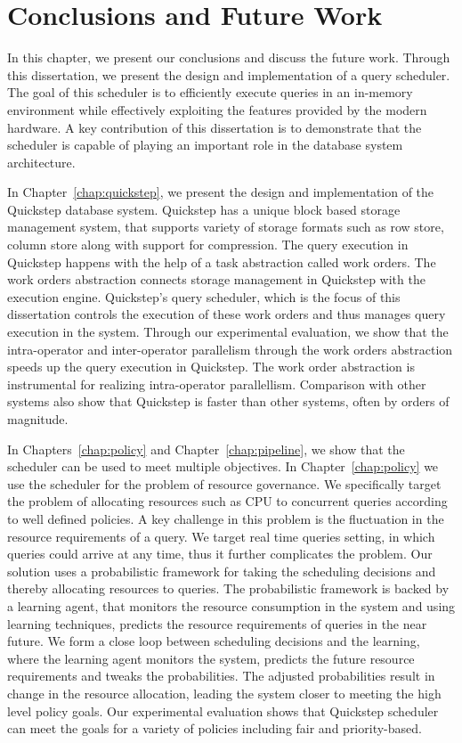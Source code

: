 \chapter{Conclusions and Future Work}
In this chapter, we present our conclusions and discuss the future work.
Through this dissertation, we present the design and implementation of a query scheduler.
The goal of this scheduler is to efficiently execute queries in an in-memory environment while effectively exploiting the features provided by the modern hardware. 
A key contribution of this dissertation is to demonstrate that the scheduler is capable of playing an important role in the database system architecture.

In Chapter~\ref{chap:quickstep}, we present the design and implementation of the Quickstep database system. 
Quickstep has a unique block based storage management system, that supports variety of storage formats such as row store, column store along with support for compression. 
The query execution in Quickstep happens with the help of a task abstraction called work orders. 
The work orders abstraction connects storage management in Quickstep with the execution engine. 
Quickstep's query scheduler, which is the focus of this dissertation controls the execution of these work orders and thus manages query execution in the system. 
Through our experimental evaluation, we show that the intra-operator and inter-operator parallelism through the work orders abstraction speeds up the query execution in Quickstep.
The work order abstraction is instrumental for realizing intra-operator parallellism.
Comparison with other systems also show that Quickstep is faster than other systems, often by orders of magnitude. 

In Chapters~\ref{chap:policy} and Chapter~\ref{chap:pipeline}, we show that the scheduler can be used to meet multiple objectives.
In Chapter~\ref{chap:policy} we use the scheduler for the problem of resource governance.
We specifically target the problem of allocating resources such as CPU to concurrent queries according to well defined policies.
A key challenge in this problem is the fluctuation in the resource requirements of a query.
We target real time queries setting, in which queries could arrive at any time, thus it further complicates the problem.
Our solution uses a probabilistic framework for taking the scheduling decisions and thereby allocating resources to queries.
The probabilistic framework is backed by a learning agent, that monitors the resource consumption in the system and using learning techniques, predicts the resource requirements of queries in the near future.  
We form a close loop between scheduling decisions and the learning, where the learning agent monitors the system, predicts the future resource requirements and tweaks the probabilities. 
The adjusted probabilities result in change in the resource allocation, leading the system closer to meeting the high level policy goals.
Our experimental evaluation shows that Quickstep scheduler can meet the goals for a variety of policies including fair and priority-based. 

